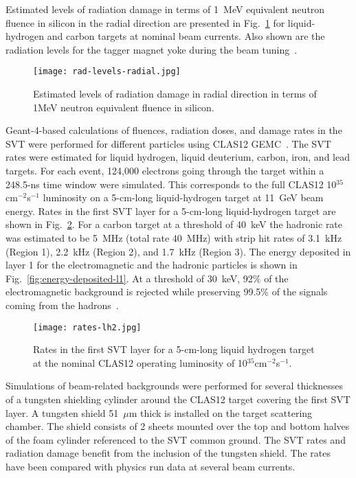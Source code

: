 Estimated levels of radiation damage in terms of 1~MeV equivalent neutron fluence in silicon in the radial direction are presented in Fig.~\ref{fig:rad-levels-radial} for liquid-hydrogen and carbon targets at nominal beam currents. Also shown are the radiation levels for the tagger magnet yoke during the beam tuning~\cite{BEAMLINENIM}.

\begin{figure}[hbt] 
\texttt{[image: rad-levels-radial.jpg]}
\caption{Estimated levels of radiation damage in radial direction in terms of 1MeV neutron equivalent fluence in silicon.}
\label{fig:rad-levels-radial}
\end{figure}

Geant-4-based calculations of fluences, radiation doses, and damage rates in the SVT were performed for different particles using CLAS12 GEMC~\cite{MCNIM}. The SVT rates were estimated for liquid hydrogen, liquid deuterium, carbon, iron, and lead targets. For each event, 124,000 electrons going through the target within a 248.5-ns time window were simulated. This corresponds to the full CLAS12 10$^{35}$cm$^{-2}$s$^{-1}$ luminosity on a 5-cm-long liquid-hydrogen target at 11~GeV beam energy. Rates in the first SVT layer for a 5-cm-long liquid-hydrogen target are shown in Fig.~\ref{fig:rates-lh2}. For a carbon target at a threshold of 40~keV the hadronic rate was estimated to be 5~MHz (total rate 40~MHz) with strip hit rates of 3.1~kHz (Region 1), 2.2~kHz (Region 2), and 1.7~kHz (Region 3). The energy deposited in layer 1 for the electromagnetic and the hadronic particles is shown in Fig.~\ref{fig:energy-deposited-l1}. At a threshold of 30~keV, 92$\%$ of the electromagnetic background is rejected while preserving  99.5$\%$ of the signals coming from the hadrons~\cite{TDRSVT}.

\begin{figure}[hbt] 
\texttt{[image: rates-lh2.jpg]}
\caption{Rates in the first SVT layer for a 5-cm-long liquid hydrogen target at the nominal CLAS12 operating luminosity of 10$^{35}$cm$^{-2}$s$^{-1}$.}
\label{fig:rates-lh2}
\end{figure}

Simulations of beam-related backgrounds were performed for several thicknesses of a tungsten shielding cylinder around the CLAS12 target covering the first SVT layer. A tungsten shield 51~$\mu$m thick is installed on the target scattering chamber. The shield consists of 2 sheets mounted over the top and bottom halves of the foam cylinder referenced to the SVT common ground. The SVT rates and radiation damage benefit from the inclusion of the tungsten shield. The rates have been compared with physics run data at several beam currents.

